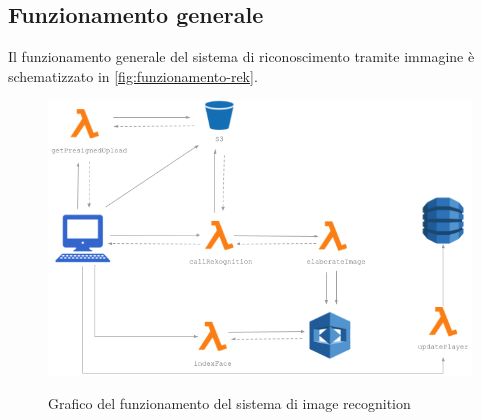 	
	
	\subsection{Funzionamento generale}
	Il funzionamento generale del sistema di riconoscimento tramite immagine è schematizzato in \autoref{fig:funzionamento-rek}.
	
	\begin{figure}[H]
		\centering
		\includegraphics[width=12cm]{immagini/funzionamento.png} \\
		\caption{\label{fig:funzionamento-rek} Grafico del funzionamento del sistema di image recognition}
	\end{figure}

